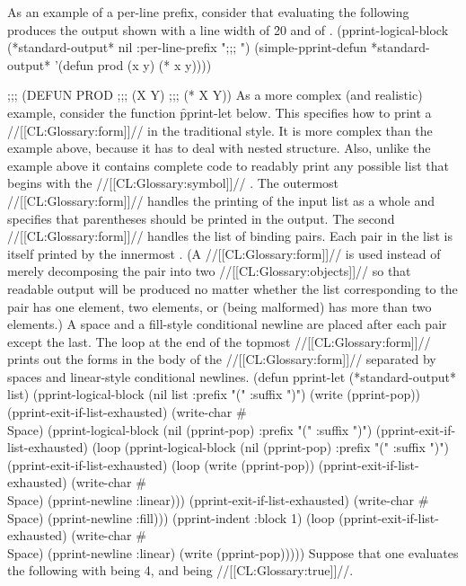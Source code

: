 As an example of a per-line prefix, consider that evaluating the following produces the output shown with a line width of \f{20} and  of \nil.
  \code
 (pprint-logical-block (*standard-output* nil :per-line-prefix ";;; ")
   (simple-pprint-defun *standard-output* '(defun prod (x y) (* x y))))
 
 ;;; (DEFUN PROD
 ;;;        (X Y)
 ;;;   (* X Y)) \endcode
  As a more complex (and realistic) example, consider the function \f{pprint-let} below.  This specifies how to print a  //[[CL:Glossary:form]]// in the traditional style.  It is more complex than the example above, because it has to deal with nested structure.  Also, unlike the example above it contains complete code to  readably print any possible list that begins with the //[[CL:Glossary:symbol]]// . The outermost  //[[CL:Glossary:form]]// handles the printing of the input list as a whole and specifies that parentheses should be printed in the output.  The second  //[[CL:Glossary:form]]// handles the list  of binding pairs.  Each pair in the list is itself printed by the innermost .  (A  //[[CL:Glossary:form]]// is used instead of merely decomposing the pair into two //[[CL:Glossary:objects]]// so that readable output will be produced no matter whether the list corresponding to the pair has one element, two elements, or (being malformed) has more than two elements.)    A space and a  fill-style conditional newline are placed after each pair except the last.  The loop at the end of the topmost  //[[CL:Glossary:form]]// prints out the forms in the body of the  //[[CL:Glossary:form]]// separated by spaces and  linear-style conditional newlines.
  \code
 (defun pprint-let (*standard-output* list)
   (pprint-logical-block (nil list :prefix "(" :suffix ")")
     (write (pprint-pop))
     (pprint-exit-if-list-exhausted)
     (write-char #\\Space)
     (pprint-logical-block (nil (pprint-pop) :prefix "(" :suffix ")")
       (pprint-exit-if-list-exhausted)
       (loop (pprint-logical-block (nil (pprint-pop) :prefix "(" :suffix ")")
               (pprint-exit-if-list-exhausted)
               (loop (write (pprint-pop))
                     (pprint-exit-if-list-exhausted)
                     (write-char #\\Space)
                     (pprint-newline :linear)))
             (pprint-exit-if-list-exhausted)
             (write-char #\\Space)
             (pprint-newline :fill)))
     (pprint-indent :block 1)
     (loop (pprint-exit-if-list-exhausted)
           (write-char #\\Space)
           (pprint-newline :linear)
           (write (pprint-pop))))) \endcode
  Suppose that one evaluates the following with  being 4,  and  being //[[CL:Glossary:true]]//.

